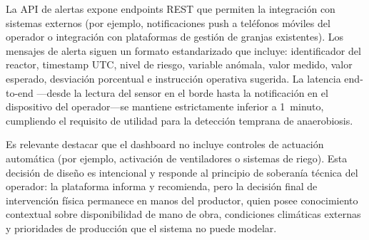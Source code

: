 La API de alertas expone endpoints REST que permiten la integración con sistemas externos (por ejemplo, notificaciones push a teléfonos móviles del operador o integración con plataformas de gestión de granjas existentes). Los mensajes de alerta siguen un formato estandarizado que incluye: identificador del reactor, timestamp UTC, nivel de riesgo, variable anómala, valor medido, valor esperado, desviación porcentual e instrucción operativa sugerida. La latencia end-to-end ---desde la lectura del sensor en el borde hasta la notificación en el dispositivo del operador---se mantiene estrictamente inferior a 1~minuto, cumpliendo el requisito de utilidad para la detección temprana de anaerobiosis.

Es relevante destacar que el dashboard no incluye controles de actuación automática (por ejemplo, activación de ventiladores o sistemas de riego). Esta decisión de diseño es intencional y responde al principio de soberanía técnica del operador: la plataforma informa y recomienda, pero la decisión final de intervención física permanece en manos del productor, quien posee conocimiento contextual sobre disponibilidad de mano de obra, condiciones climáticas externas y prioridades de producción que el sistema no puede modelar.
